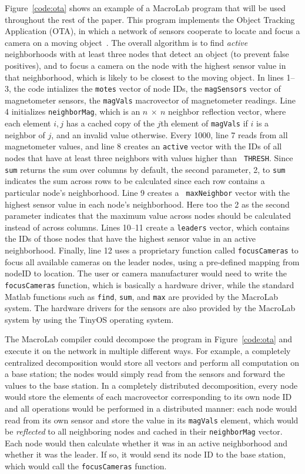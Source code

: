 Figure~\ref{code:ota} shows an example of a MacroLab program that will be used
throughout the rest of the paper.  This program implements the Object Tracking
Application (OTA), in which a network of sensors cooperate to locate and focus a
camera on a moving object~\cite{Whitehousea}.  The overall algorithm is to find
\emph{active} neighborhoods with at least three nodes that detect an object (to
prevent false positives), and to focus a camera on the node with the highest
sensor value in that neighborhood, which is likely to be closest to the moving
object.  In lines 1--3, the code intializes the {\tt motes} vector of node IDs,
the {\tt magSensors} vector of magnetometer sensors, the {\tt magVals}
macrovector of magnetometer readings.  Line 4 initializes {\tt neighborMag},
which is an $n \ \times \ n$ neighbor reflection vector, where each element
$i,j$ has a cached copy of the $j$th element of {\tt magVals} if $i$ is a
neighbor of $j$, and an invalid value otherwise.  Every 1000\ms, line 7 reads
from all magnetometer values, and line 8 creates an {\tt active} vector with the
IDs of all nodes that have at least three neighbors with values higher than {\tt
THRESH}. Since {\tt sum} returns the sum over columns by default, the second
parameter, 2, to {\tt sum} indicates the sum across rows to be calculated since
each row contains a particular node's neighborhood.  Line 9 creates a {\tt
maxNeighbor} vector with the highest sensor value in each node's
neighborhood. Here too the 2 as the second parameter indicates that the maximum
value across nodes should be calculated instead of across columns. Lines 10--11
create a {\tt leaders} vector, which contains the IDs of those nodes that have
the highest sensor value in an active neighborhood.  Finally, line 12 uses a
proprietary function called {\tt focusCameras} to focus all available cameras on
the leader nodes, using a pre-defined mapping from nodeID to location.  The user
or camera manufacturer would need to write the {\tt focusCameras} function,
which is basically a hardware driver, while the standard Matlab functions such
as {\tt find}, {\tt sum}, and {\tt max} are provided by the MacroLab system.
The hardware drivers for the sensors are also provided by the MacroLab system by
using the TinyOS operating system.

The MacroLab compiler could decompose the program in Figure~\ref{code:ota} and
execute it on the network in multiple different ways.  For example, a completely
centralized decomposition would store all vectors and perform all computation on
a base station; the nodes would simply read from the sensors and forward the
values to the base station.  In a completely distributed decomposition, every
node would store the elements of each macrovector corresponding to its own node
ID and all operations would be performed in a distributed manner: each node
would read from its own sensor and store the value in its {\tt magVals} element,
which would be \emph{reflected} to all neighboring nodes and cached in their
{\tt neighborMag} vector.  Each node would then calculate whether it was in an
active neighborhood and whether it was the leader.  If so, it would send its
node ID to the base station, which would call the {\tt focusCameras} function.

